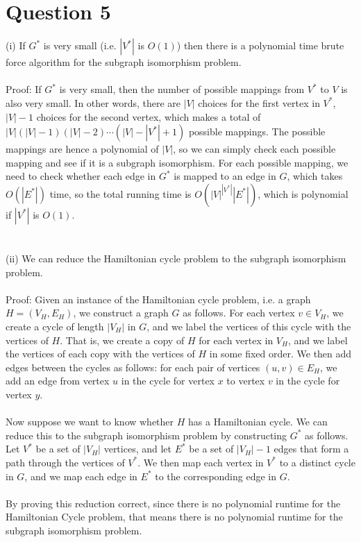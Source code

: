 \documentclass{article}
\begin{document}
\section{Question 5}
(i) If $G^*$ is very small (i.e. $|V^*|$ is $O(1)$) then there is a polynomial time brute force algorithm for the subgraph isomorphism problem.\\\\
Proof: If $G^*$ is very small, then the number of possible mappings from $V^*$ to $V$ is also very small. In other words, there are $|V|$ choices for the first vertex in $V^*$, $|V|-1$ choices for the second vertex, which makes a total of $|V|(|V|-1)(|V|-2)\cdots(|V|-|V^*|+1)$ possible mappings. The possible mappings are hence a polynomial of $|V|$, so we can simply check each possible mapping and see if it is a subgraph isomorphism. For each possible mapping, we need to check whether each edge in $G^*$ is mapped to an edge in $G$, which takes $O(|E^*|)$ time, so the total running time is $O(|V|^{|V^*|} |E^*|)$, which is polynomial if $|V^*|$ is $O(1)$.\\\\\\
(ii) We can reduce the Hamiltonian cycle problem to the subgraph isomorphism problem.\\\\
Proof: Given an instance of the Hamiltonian cycle problem, i.e. a graph $H=(V_H,E_H)$, we construct a graph $G$ as follows. For each vertex $v\in V_H$, we create a cycle of length $|V_H|$ in $G$, and we label the vertices of this cycle with the vertices of $H$. That is, we create a copy of $H$ for each vertex in $V_H$, and we label the vertices of each copy with the vertices of $H$ in some fixed order. We then add edges between the cycles as follows: for each pair of vertices $(u,v)\in E_H$, we add an edge from vertex $u$ in the cycle for vertex $x$ to vertex $v$ in the cycle for vertex $y$.\\\\
Now suppose we want to know whether $H$ has a Hamiltonian cycle. We can reduce this to the subgraph isomorphism problem by constructing $G^*$ as follows. Let $V^*$ be a set of $|V_H|$ vertices, and let $E^*$ be a set of $|V_H|-1$ edges that form a path through the vertices of $V^*$. We then map each vertex in $V^*$ to a distinct cycle in $G$, and we map each edge in $E^*$ to the corresponding edge in $G$. \\\\
By proving this reduction correct, since there is no polynomial runtime for the Hamiltonian Cycle problem, that means there is no polynomial runtime for the subgraph isomorphism problem.
\end{document}
